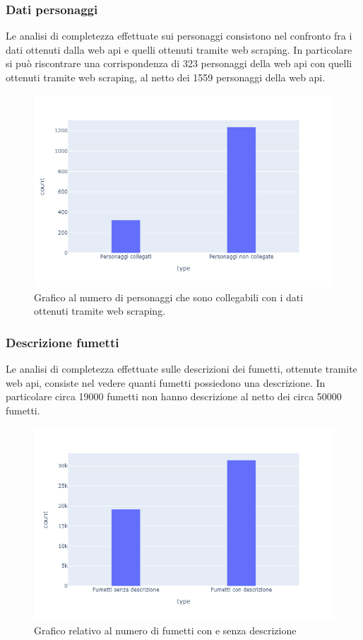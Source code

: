\documentclass[
12pt, %
a4paper, %
oneside, %
headinclude,footinclude, %
BCOR5mm, %
]{scrartcl}
\begin{document}
\subsubsection{Dati personaggi}
Le analisi di completezza effettuate sui personaggi consistono nel confronto fra i dati ottenuti dalla web api e quelli ottenuti tramite web scraping. In particolare si può riscontrare una corrispondenza di 323 personaggi della web api con quelli ottenuti tramite web scraping, al netto dei 1559 personaggi della web api.
\begin{figure}[H]
  \includegraphics[scale=0.5]{plot_corrispondenza_personaggi.png}
  \caption{Grafico al numero di personaggi che sono collegabili con i dati ottenuti tramite web scraping.}
\end{figure}
\subsubsection{Descrizione fumetti}
Le analisi di completezza effettuate sulle descrizioni dei fumetti, ottenute tramite web api, consiste nel vedere quanti fumetti possiedono una descrizione. In particolare circa 19000 fumetti non hanno descrizione al netto dei circa 50000 fumetti.
\begin{figure}[H]
  \includegraphics[scale=0.5]{plot_descrizione_fumetti.png}
  \caption{Grafico relativo al numero di fumetti con e senza descrizione}
\end{figure}
\end{document}
